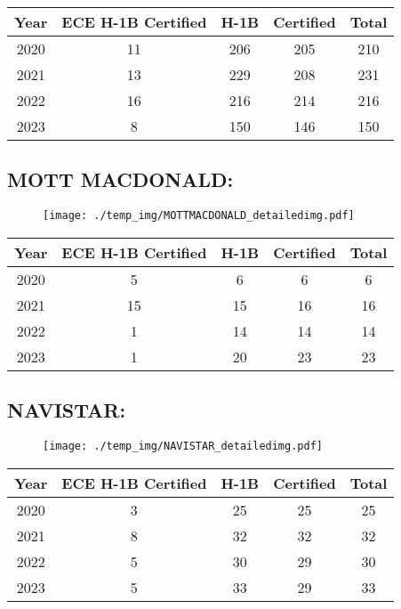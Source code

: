 \documentclass{article}%
\begin{document}
%
\begin{longtable}{c|c|c|c|c}%
\hline%
Year&ECE H{-}1B Certified&H{-}1B&Certified&Total\\%
\hline%
2020&11&206&205&210\\%
\hline%
2021&13&229&208&231\\%
\hline%
2022&16&216&214&216\\%
\hline%
2023&8&150&146&150\\%
\hline%
\end{longtable}

%
\newpage%
\subsection{MOTT MACDONALD:}%
\label{subsec:MOTTMACDONALD}%
\label{MOTTMACDONALDdetailed}%


\begin{figure}[htbp]%
\centering%
\texttt{[image: ./temp\_img/MOTTMACDONALD\_detailedimg.pdf]}%
\end{figure}

%
\begin{longtable}{c|c|c|c|c}%
\hline%
Year&ECE H{-}1B Certified&H{-}1B&Certified&Total\\%
\hline%
2020&5&6&6&6\\%
\hline%
2021&15&15&16&16\\%
\hline%
2022&1&14&14&14\\%
\hline%
2023&1&20&23&23\\%
\hline%
\end{longtable}

%
\newpage%
\subsection{NAVISTAR:}%
\label{subsec:NAVISTAR}%
\label{NAVISTARdetailed}%


\begin{figure}[htbp]%
\centering%
\texttt{[image: ./temp\_img/NAVISTAR\_detailedimg.pdf]}%
\end{figure}

%
\begin{longtable}{c|c|c|c|c}%
\hline%
Year&ECE H{-}1B Certified&H{-}1B&Certified&Total\\%
\hline%
2020&3&25&25&25\\%
\hline%
2021&8&32&32&32\\%
\hline%
2022&5&30&29&30\\%
\hline%
2023&5&33&29&33\\%
\hline%
\end{longtable}
\end{document}
